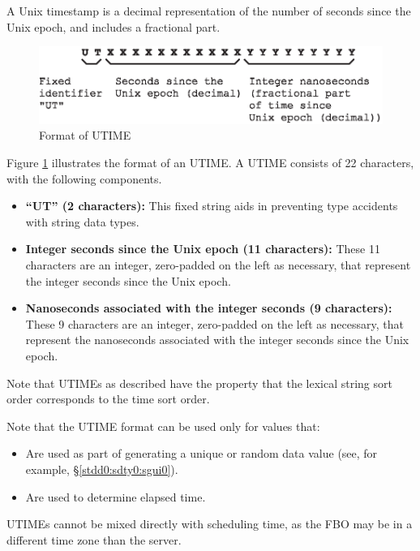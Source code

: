 \documentclass[letterpaper,10pt,titlepage]{article}
\begin{document}
%
A Unix timestamp is a decimal representation of the number of
seconds since the Unix epoch, and includes a fractional part.

\begin{figure}
\centering
\includegraphics[width=4.6in]{utimeformat01.eps}
\caption{Format of UTIME}
\label{fig:stdd0:sdty0:sutm0:00}
\end{figure}

Figure \ref{fig:stdd0:sdty0:sutm0:00} illustrates the format of
an UTIME.  A UTIME consists of 22 characters, with the following
components.

\begin{itemize}
\item \textbf{``UT'' (2 characters):}
      This fixed string aids in preventing type accidents with
      string data types.
\item \textbf{Integer seconds since the Unix epoch (11 characters):}
      These 11 characters are an integer, zero-padded on the left as
      necessary, that represent the integer seconds since the Unix
      epoch.
\item \textbf{Nanoseconds associated with the integer seconds (9 characters):}
      These 9 characters are an integer, zero-padded on the left as
      necessary, that represent the nanoseconds associated with the
      integer seconds since the Unix
      epoch.  
\end{itemize}

Note that UTIMEs as described have the property that the lexical
string sort order corresponds to the time sort order.

Note that the UTIME format can be used only for values that:

\begin{itemize}
\item Are used as part of generating a unique or random data value
      (see, for example, \S{}\ref{stdd0:sdty0:sgui0}).
\item Are used to determine elapsed time.
\end{itemize}

UTIMEs cannot be mixed directly with scheduling time, as the FBO 
may be in a different time zone than the server.
\end{document}
